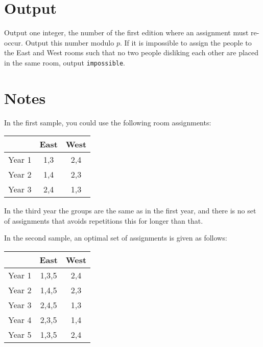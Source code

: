 \section*{Output}
Output one integer, the number of the first edition where an assignment must re-occur. Output this number modulo $p$.
If it is impossible to assign the people to the East and West rooms such that no two people disliking each other are placed in the same room, output \texttt{impossible}.


\section*{Notes}
In the first sample, you could use the following room assignments:
\begin{center}
\begin{tabular}{ c | c c }
  & East & West \\
  \hline
  Year 1 & 1,3 & 2,4 \\
  Year 2 & 1,4 & 2,3 \\
  Year 3 & 2,4 & 1,3
\end{tabular}
\end{center}
In the third year the groups are the same as in the first year, and there is
no set of assignments that avoids repetitions this for longer than that.

In the second sample, an optimal set of assignments is given as follows:
\begin{center}
\begin{tabular}{ c | c c }
  & East & West \\
  \hline
  Year 1 & 1,3,5 & 2,4 \\
  Year 2 & 1,4,5 & 2,3 \\
  Year 3 & 2,4,5 & 1,3 \\
  Year 4 & 2,3,5 & 1,4 \\
  Year 5 & 1,3,5 & 2,4
\end{tabular}
\end{center}
